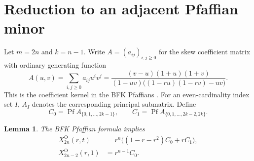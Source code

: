 \documentclass[11pt]{article}
\newtheorem{lemma}[theorem]{Lemma}
\newcommand{\Pf}{\operatorname{Pf}}
\begin{document}
\section{Reduction to an adjacent Pfaffian minor}

Let \(m=2n\) and \(k=n-1\).  Write \(A=(a_{ij})_{i,j\geq0}\) for the skew
coefficient matrix with ordinary generating function
\begin{equation}
 A(u,v)=\sum_{i,j\geq0}a_{ij}u^iv^j
 =\frac{(v-u)(1+u)(1+v)}
 {(1-uv)\bigl((1-ru)(1-rv)-uv\bigr)}.
 \label{eq:A-kernel}
\end{equation}
This is the coefficient kernel in the BFK Pfaffians
\cite[Eqs.~(8.10)--(8.11)]{BFK2026}.  For an even-cardinality index set
\(I\), \(A_I\) denotes the corresponding principal submatrix.  Define
\begin{equation}
 C_0=\Pf A_{\{0,1,\ldots,2k-1\}},\qquad
 C_1=\Pf A_{\{0,1,\ldots,2k-2,2k\}}.
 \label{eq:C0C1}
\end{equation}

\begin{lemma}
\label{lem:reduction}
The BFK Pfaffian formula implies
\begin{align}
 [t^3]X^{\mathrm O}_{2n}(r,t)
 &=r^n\bigl((1-r-r^2)C_0+rC_1\bigr),
 \label{eq:lowt}\\
 X^{\mathrm O}_{2n-2}(r,1)&=r^{n-1}C_0.
 \label{eq:unrefined}
\end{align}
\end{lemma}
\end{document}
